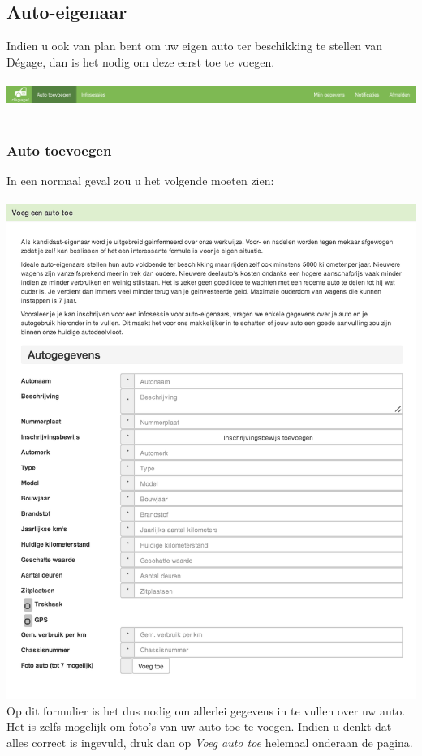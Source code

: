 \documentclass[11pt,a4paper,oneside]{article}
\begin{document}
\subsection{Auto-eigenaar}
Indien u ook van plan bent om uw eigen auto ter beschikking te stellen van D\'egage, dan is het nodig om deze eerst toe te voegen. \\\\
\includegraphics[scale=0.4]{img/menu-autotoevoegen} \\\\
\subsubsection{Auto toevoegen}
In een normaal geval zou u het volgende moeten zien:\\\\
\includegraphics[scale=0.6]{img/autotoevoegen} \\

Op dit formulier is het dus nodig om allerlei gegevens in te vullen over uw auto. Het is zelfs mogelijk om foto's van uw auto toe te voegen. Indien u denkt dat alles correct is ingevuld, druk dan op \textit{Voeg auto toe} helemaal onderaan de pagina.
\end{document}

